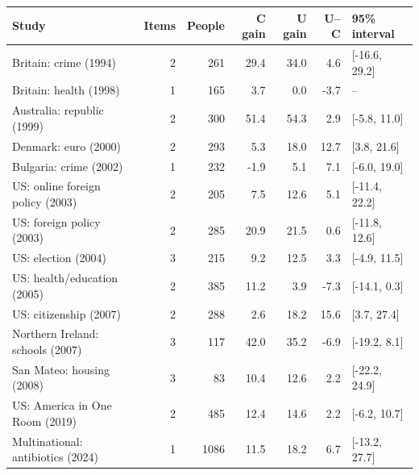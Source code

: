 \begin{tabular}{lrrrrrl}
\toprule
Study & Items & People & C gain & U gain & U--C & 95\% interval \\
\midrule
Britain: crime (1994) & 2 & 261 & 29.4 & 34.0 & 4.6 & [-16.6, 29.2] \\
Britain: health (1998) & 1 & 165 & 3.7 & 0.0 & -3.7 & -- \\
Australia: republic (1999) & 2 & 300 & 51.4 & 54.3 & 2.9 & [-5.8, 11.0] \\
Denmark: euro (2000) & 2 & 293 & 5.3 & 18.0 & 12.7 & [3.8, 21.6] \\
Bulgaria: crime (2002) & 1 & 232 & -1.9 & 5.1 & 7.1 & [-6.0, 19.0] \\
US: online foreign policy (2003) & 2 & 205 & 7.5 & 12.6 & 5.1 & [-11.4, 22.2] \\
US: foreign policy (2003) & 2 & 285 & 20.9 & 21.5 & 0.6 & [-11.8, 12.6] \\
US: election (2004) & 3 & 215 & 9.2 & 12.5 & 3.3 & [-4.9, 11.5] \\
US: health/education (2005) & 2 & 385 & 11.2 & 3.9 & -7.3 & [-14.1, 0.3] \\
US: citizenship (2007) & 2 & 288 & 2.6 & 18.2 & 15.6 & [3.7, 27.4] \\
Northern Ireland: schools (2007) & 3 & 117 & 42.0 & 35.2 & -6.9 & [-19.2, 8.1] \\
San Mateo: housing (2008) & 3 & 83 & 10.4 & 12.6 & 2.2 & [-22.2, 24.9] \\
US: America in One Room (2019) & 2 & 485 & 12.4 & 14.6 & 2.2 & [-6.2, 10.7] \\
Multinational: antibiotics (2024) & 1 & 1086 & 11.5 & 18.2 & 6.7 & [-13.2, 27.7] \\
\bottomrule
\end{tabular}
